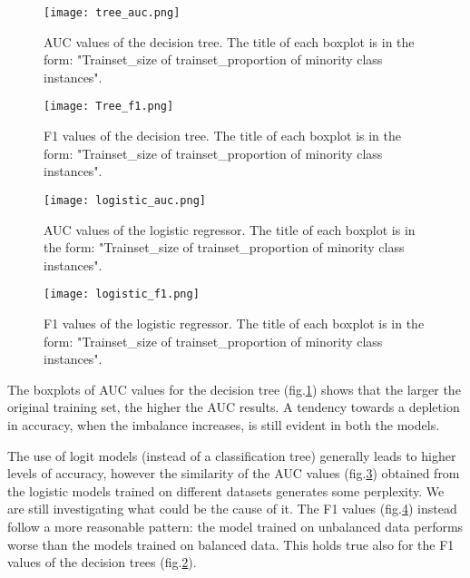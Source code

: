 \documentclass{article}
\begin{document}
\begin{figure}[htbp]
	\centering
	\texttt{[image: tree\_auc.png]}
	\caption{AUC values of the decision tree. The title of each boxplot is in the form: "Trainset\_size of trainset\_proportion of minority class instances".}
	\label{fig:treeAUC}
\end{figure}

\begin{figure}[htbp]
	\centering
	\texttt{[image: Tree\_f1.png]}
	\caption{F1 values of the decision tree. The title of each boxplot is in the form: "Trainset\_size of trainset\_proportion of minority class instances".}
	\label{fig:treeF1}
\end{figure}
\begin{figure}[htbp]
	\centering
	\texttt{[image: logistic\_auc.png]}
	\caption{AUC values of the logistic regressor. The title of each boxplot is in the form: "Trainset\_size of trainset\_proportion of minority class instances".}
	\label{fig:logisticAUC}
\end{figure}
\begin{figure}[htbp]
	\centering
	\texttt{[image: logistic\_f1.png]}
	\caption{F1 values of the logistic regressor. The title of each boxplot is in the form: "Trainset\_size of trainset\_proportion of minority class instances".}
	\label{fig:logisticF1}
\end{figure}

The boxplots of AUC values for the decision tree (fig.\ref{fig:treeAUC}) shows that the larger the original training set, the higher the AUC results. A tendency towards a depletion in accuracy, when the imbalance increases, is still evident in both the models.

The use of logit models (instead of a classification tree) generally leads to higher levels of accuracy, however the similarity of the AUC values (fig.\ref{fig:logisticAUC}) obtained from the logistic models trained on different datasets generates some perplexity. We are still investigating what could be the cause of it. The F1 values (fig.\ref{fig:logisticF1}) instead follow a more reasonable pattern: the model trained on unbalanced data performs worse than the models trained on balanced data. This holds true also for the F1 values of the decision trees (fig.\ref{fig:treeF1}).
\end{document}
